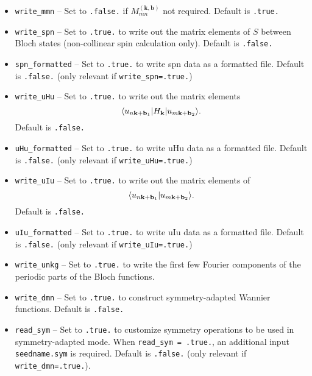 \begin{itemize}
\item   \verb#write_mmn# -- Set to \verb#.false.# if
   $M_{mn}^{(\mathbf{k,b})}$ not required. Default is \verb#.true.#

\item   \verb#write_spn# -- Set to \verb#.true.# to write out the matrix
   elements of $S$ between Bloch states (non-collinear spin calculation
   only). Default is \verb#.false.#

\item   \verb#spn_formatted# -- Set to \verb#.true.# to write spn data as a formatted file. Default is \verb#.false.# (only relevant if
   \verb#write_spn=.true.#)


\item   \verb#write_uHu# -- Set to \verb#.true.# to write out the matrix
   elements $$\langle u_{n{\bf k}+{\bf b}_1}\vert
H_{\bf k}\vert u_{m{\bf k}+{\bf b}_2}\rangle.
$$
Default is \verb#.false.#

\item   \verb#uHu_formatted# -- Set to \verb#.true.# to write uHu data as a formatted file. Default is \verb#.false.# (only relevant if
   \verb#write_uHu=.true.#)


\item   \verb#write_uIu# -- Set to \verb#.true.# to write out the matrix
   elements of $$\langle  u_{n{\bf k}+{\bf b}_1}\vert
u_{m{\bf k}+{\bf b}_2}\rangle.
$$ Default is \verb#.false.# 

\item   \verb#uIu_formatted# -- Set to \verb#.true.# to write uIu data as a formatted file. Default is \verb#.false.# (only relevant if
   \verb#write_uIu=.true.#)



\item   \verb#write_unkg# -- Set to \verb#.true.# to write the first few
   Fourier components of the periodic parts of the Bloch functions.

\item   \verb#write_dmn# -- Set to \verb#.true.# to construct symmetry-adapted Wannier functions.  
Default is \verb#.false.#

\item   \verb#read_sym# -- Set to \verb#.true.# to customize symmetry operations to be used in symmetry-adapted mode. 
When  \verb#read_sym = .true.#, an additional input {\tt seedname.sym} is required. 
Default is \verb#.false.#
(only relevant if \verb#write_dmn=.true.#). 



\end{itemize}

